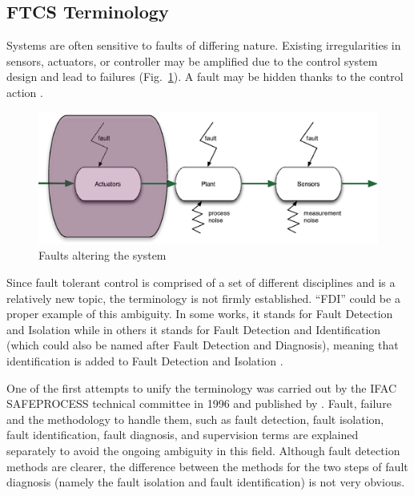 \subsection{FTCS Terminology}\label{ch2:terminology}

Systems are often sensitive to faults of differing nature. 
Existing irregularities in sensors, actuators, or controller may be amplified due to the control system design and lead to failures (Fig.~\ref{fig:faultsInTheSystem}). 
A fault may be hidden thanks to the control action \cite{ducard2009fault}.

\begin{figure}
\begin{center}
\includegraphics[width=15cm]{figures/faultsInTheSystem}    %
\caption{Faults altering the system } 
\label{fig:faultsInTheSystem}
\end{center}
\end{figure}

Since fault tolerant control is comprised of a set of different disciplines and is a relatively new topic, the terminology is not firmly established. 
``FDI'' could be a proper example of this ambiguity. 
In some works, it stands for Fault Detection and Isolation while in others it stands for Fault Detection and Identification (which could also be named after Fault Detection and Diagnosis), 
meaning that identification is added to Fault Detection and Isolation \cite{zhang2008bibliographical}.

One of the first attempts to unify the terminology was carried out by the IFAC SAFEPROCESS technical committee in 1996 and published by \cite{isermann1997trends}. 
Fault, failure and the methodology to handle them, such as fault detection, fault isolation, fault identification, fault diagnosis, and supervision terms are explained separately to avoid the ongoing ambiguity in this field. 
Although fault detection methods are clearer, the difference between the methods for the two steps of fault diagnosis (namely the fault isolation and fault identification) is not very obvious.

